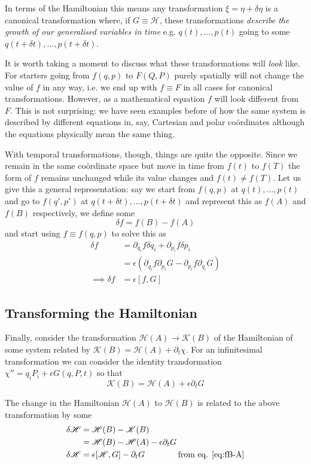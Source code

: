 \documentclass[english,seminar,headertitle]{lecture}
\newcommand{\ham}{\mathscr{H}}
\newcommand{\kam}{\mathscr{K}}
\begin{document}
In terms of the Hamiltonian this means any transformation $\xi = \eta + \delta \eta$ is a canonical transformation where, if $G \equiv \ham$, these transformations \textit{describe the growth of our generalised variables in time} e.g. $q(t), \ldots, p(t)$ going to some $q(t+\delta t),\ldots,p(t+\delta t)$.

It is worth taking a moment to discuss what these transformations will \textit{look} like. For starters going from $f(q,p)$ to $F(Q,P)$ purely spatially will not change the value of $f$ in any way, i.e. we end up with $f \equiv F$ in all cases for canonical transformations. However, as a mathematical equation $f$ will look different from $F$. This is not surprising: we have seen examples before of how the same system is described by different equations in, say, Cartesian and polar co\"{o}rdinates although the equations physically mean the same thing.

With temporal transformations, though, things are quite the opposite. Since we remain in the same co\"{o}rdinate space but move in time from $f(t)$ to $f(T)$ the form of $f$ remains unchanged while its value changes and $f(t) \neq f(T)$. Let us give this a general representation: say we start from $f(q,p)$ at $q(t),\ldots,p(t)$ and go to $f(q',p')$ at $q(t+\delta t),\ldots,p(t+\delta t)$ and represent this as $f(A)$ and $f(B)$ respectively, we define some
$$
\delta f = f(B) - f(A)
$$
and start using $f \equiv f(q,p)$ to solve this as
\begin{align}
	\delta f &= \partial_{q_i} f \delta q_i + \partial_{p_i} f \delta p_i \nonumber\\
			&= \epsilon \left( \partial_{q_i} f \partial_{p_i} G - \partial_{p_i} f \partial_{q_i} G \right) \nonumber\\
\implies \delta f &= \epsilon [f, G] \label{eq:fB-A}
\end{align}

\subsection{Transforming the Hamiltonian}

Finally, consider the transformation $\ham(A) \rightarrow \kam(B)$ of the Hamiltonian of some system related by $\kam(B) = \ham(A) + \partial_t \chi$. For an infinitesimal transformation we can consider the identity transformation $\chi'' = q_iP_i + \epsilon G(q,P,t)$ so that
$$
\kam(B) = \ham(A) + \epsilon \partial_t G
$$

The change in the Hamiltonian $\ham(A)$ to $\ham(B)$ is related to the above transformation by some
\begin{align*}
	\delta \ham &= \ham(B) - \kam(B) \\
				&= \ham(B) - \ham(A) - \epsilon \partial_t G \\
	\delta \ham &= \epsilon[\ham, G] - \partial_t G \qquad\qquad\textrm{from eq. \eqref{eq:fB-A}}
\end{align*}
\end{document}
